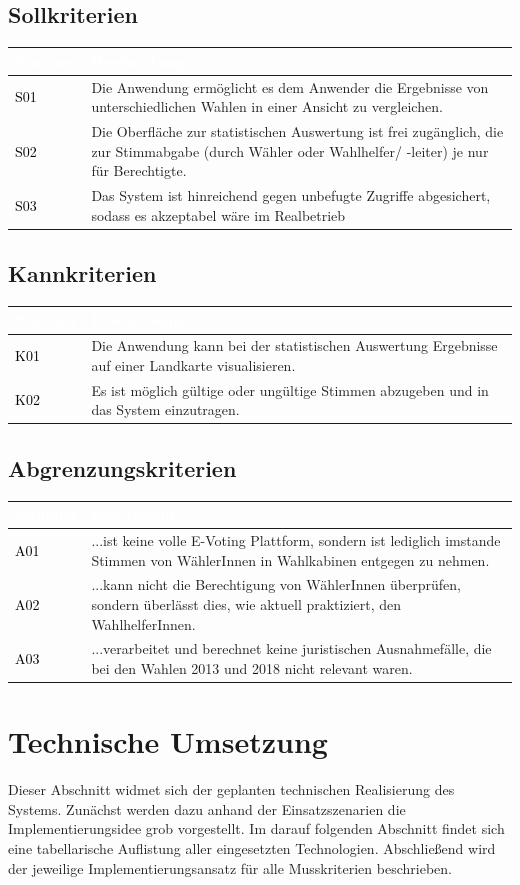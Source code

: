 \documentclass[a4paper,12pt]{article}
\newcommand\addrow[2]{\textcolor{black}{#1} &#2\\ \hline}
\newcommand\addheading[2]{\rowcolor{TUMBlue}\textcolor{white}{#1} & \textcolor{white}{#2}\\ \hline}
\newcommand\tabularhead{\begin{tabular}{|b|p{13cm}|}
\hline
}
\newenvironment{usecase}{\tabularhead}
{\hline\end{tabular}}
\begin{document}
\subsection{Sollkriterien}
\begin{usecase}
	\addheading{Nummer}{Beschreibung} 
	\addrow{S01}{Die Anwendung ermöglicht es dem Anwender die Ergebnisse von unterschiedlichen Wahlen in einer Ansicht zu vergleichen.}
      \addrow{S02}{Die Oberfläche zur statistischen Auswertung ist frei zugänglich, die zur Stimmabgabe (durch Wähler oder Wahlhelfer/ -leiter) je nur für Berechtigte.}
      \addrow{S03}{Das System ist hinreichend gegen unbefugte Zugriffe abgesichert, sodass es akzeptabel wäre im Realbetrieb}
\end{usecase}
\subsection{Kannkriterien}
\begin{usecase}
	\addheading{Nummer}{Beschreibung} 
	\addrow{K01}{Die Anwendung kann bei der statistischen Auswertung Ergebnisse auf einer Landkarte visualisieren.}
      \addrow{K02}{Es ist möglich gültige oder ungültige Stimmen abzugeben und in das System einzutragen.}
\end{usecase}

\subsection{Abgrenzungskriterien}
\begin{usecase}
      \addheading{Nummer}{Das System...} 
      \addrow{A01}{...ist keine volle E-Voting Plattform, sondern ist lediglich imstande Stimmen von WählerInnen in Wahlkabinen entgegen zu nehmen.}
	\addrow{A02}{...kann nicht die Berechtigung von WählerInnen überprüfen, sondern überlässt dies, wie aktuell praktiziert, den WahlhelferInnen.}
	\addrow{A03}{...verarbeitet und berechnet keine juristischen Ausnahmefälle, die bei den Wahlen 2013 und 2018 nicht relevant waren.}
\end{usecase}

\section{Technische Umsetzung}
Dieser Abschnitt widmet sich der geplanten technischen Realisierung
des Systems. Zunächst werden dazu anhand der Einsatzszenarien die Implementierungsidee
grob vorgestellt. Im darauf folgenden Abschnitt findet sich eine tabellarische 
Auflistung aller eingesetzten Technologien. Abschließend
wird der jeweilige Implementierungsansatz für alle Musskriterien beschrieben.
\end{document}
